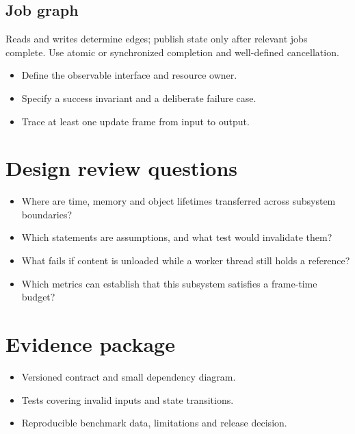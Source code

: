 \documentclass[11pt,letterpaper]{article}
\begin{document}
\subsection{Job graph}
Reads and writes determine edges; publish state only after relevant jobs complete. Use atomic or synchronized completion and well-defined cancellation.

\begin{itemize}
\item Define the observable interface and resource owner.
\item Specify a success invariant and a deliberate failure case.
\item Trace at least one update frame from input to output.
\end{itemize}
\section{Design review questions}
\begin{itemize}
\item Where are time, memory and object lifetimes transferred across subsystem boundaries?
\item Which statements are assumptions, and what test would invalidate them?
\item What fails if content is unloaded while a worker thread still holds a reference?
\item Which metrics can establish that this subsystem satisfies a frame-time budget?
\end{itemize}
\section{Evidence package}
\begin{itemize}
\item Versioned contract and small dependency diagram.
\item Tests covering invalid inputs and state transitions.
\item Reproducible benchmark data, limitations and release decision.
\end{itemize}
\end{document}
